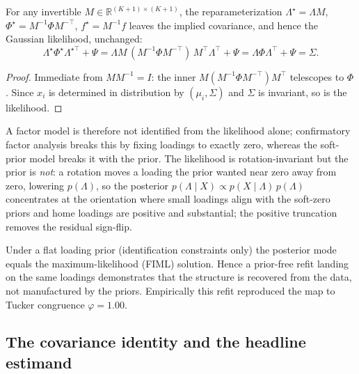 \begin{proposition}\label{propA:rotation}
For any invertible $M\in\mathbb{R}^{(K+1)\times(K+1)}$, the reparameterization
$\Lambda^{\star}=\Lambda M$, $\Phi^{\star}=M^{-1}\Phi M^{-\top}$, $f^{\star}=M^{-1}f$
leaves the implied covariance, and hence the Gaussian likelihood, unchanged:
\begin{equation}
  \Lambda^{\star}\Phi^{\star}\Lambda^{\star\top}+\Psi
  =\Lambda M\,(M^{-1}\Phi M^{-\top})\,M^{\top}\Lambda^{\top}+\Psi
  =\Lambda\Phi\Lambda^{\top}+\Psi=\Sigma .
  \label{eqA:rotation}
\end{equation}
\end{proposition}
\begin{proof}
Immediate from $M M^{-1}=I$: the inner $M(M^{-1}\Phi M^{-\top})M^\top$ telescopes to
$\Phi$. Since $x_i$ is determined in distribution by $(\mu_i,\Sigma)$ and $\Sigma$ is
invariant, so is the likelihood.
\end{proof}
A factor model is therefore not identified from the likelihood alone; confirmatory
factor analysis breaks this by fixing loadings to exactly zero, whereas the soft-prior
model breaks it with the prior. The likelihood is rotation-invariant but the prior is
\emph{not}: a rotation moves a loading the prior wanted near zero away from zero,
lowering $p(\Lambda)$, so the posterior
$p(\Lambda\mid X)\propto p(X\mid\Lambda)\,p(\Lambda)$ concentrates at the orientation
where small loadings align with the soft-zero priors and home loadings are positive and
substantial; the positive truncation removes the residual sign-flip.

\begin{corollary}\label{corA:flat}
Under a flat loading prior (identification constraints only) the posterior mode equals
the maximum-likelihood (FIML) solution. Hence a prior-free refit landing on the same
loadings demonstrates that the structure is recovered from the data, not manufactured by
the priors. Empirically this refit reproduced the map to Tucker congruence
$\varphi=1.00$.
\end{corollary}

\subsection{The covariance identity and the headline estimand}
\label{annA:sigma}

